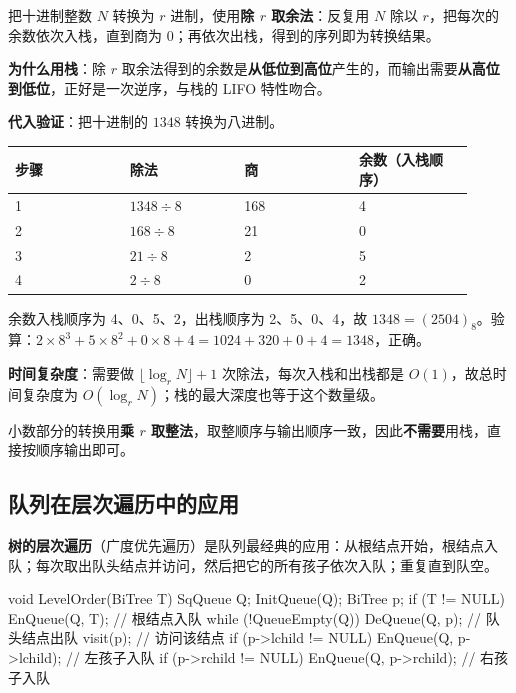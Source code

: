 \documentclass[11pt,openany,UTF8]{ctexbook}
\begin{document}
把十进制整数 $N$ 转换为 $r$ 进制，使用\textbf{除 $r$ 取余法}：反复用 $N$ 除以 $r$，把每次的余数依次入栈，直到商为 0；再依次出栈，得到的序列即为转换结果。

\textbf{为什么用栈}：除 $r$ 取余法得到的余数是\textbf{从低位到高位}产生的，而输出需要\textbf{从高位到低位}，正好是一次逆序，与栈的 LIFO 特性吻合。

\textbf{代入验证}：把十进制的 $1348$ 转换为八进制。

\begingroup\small\setlength{\tabcolsep}{4.0pt}
\begin{longtable}{@{}L{0.2278\linewidth}L{0.2278\linewidth}L{0.2278\linewidth}L{0.2278\linewidth}@{}}
\toprule
\textbf{步骤} & \textbf{除法} & \textbf{商} & \textbf{余数（入栈顺序）} \\
\midrule
{} & $1348 \div 8$ & 168 & 4 \\
2 & $168 \div 8$ & 21 & 0 \\
3 & $21 \div 8$ & 2 & 5 \\
4 & $2 \div 8$ & 0 & 2 \\
\bottomrule
\end{longtable}
\endgroup

余数入栈顺序为 4、0、5、2，出栈顺序为 2、5、0、4，故 $1348 = (2504)_8$。验算：$2 \times 8^3 + 5 \times 8^2 + 0 \times 8 + 4 = 1024 + 320 + 0 + 4 = 1348$，正确。

\textbf{时间复杂度}：需要做 $\lfloor \log_r N \rfloor + 1$ 次除法，每次入栈和出栈都是 $O(1)$，故总时间复杂度为 $O(\log_r N)$；栈的最大深度也等于这个数量级。

小数部分的转换用\textbf{乘 $r$ 取整法}，取整顺序与输出顺序一致，因此\textbf{不需要}用栈，直接按顺序输出即可。

\subsection{队列在层次遍历中的应用}

\textbf{树的层次遍历}（广度优先遍历）是队列最经典的应用：从根结点开始，根结点入队；每次取出队头结点并访问，然后把它的所有孩子依次入队；重复直到队空。

\begin{codebox}
void LevelOrder(BiTree T) {
    SqQueue Q; InitQueue(Q);
    BiTree p;
    if (T != NULL) EnQueue(Q, T);        // 根结点入队
    while (!QueueEmpty(Q)) {
        DeQueue(Q, p);                    // 队头结点出队
        visit(p);                         // 访问该结点
        if (p->lchild != NULL) EnQueue(Q, p->lchild);   // 左孩子入队
        if (p->rchild != NULL) EnQueue(Q, p->rchild);   // 右孩子入队
    }
}
\end{codebox}
\end{document}
